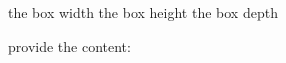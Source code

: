 \documentclass{article}
\begin{document}
\vspace*{\fill}\vspace{-5ex}
\obeylines

\newsavebox{\mybox}

\newlength{\boxwidth}
\settowidth{\boxwidth}{\usebox{\mybox}}
\newlength{\boxheight}
\settoheight{\boxheight}{\usebox{\mybox}}
\newlength{\boxdepth}
\settodepth{\boxdepth}{\usebox{\mybox}}

the box width \the\boxwidth
the box height \the\boxheight 
the box depth \the\boxdepth

provide the content: \usebox{\mybox} 



\vspace*{\fill}
\end{document}
